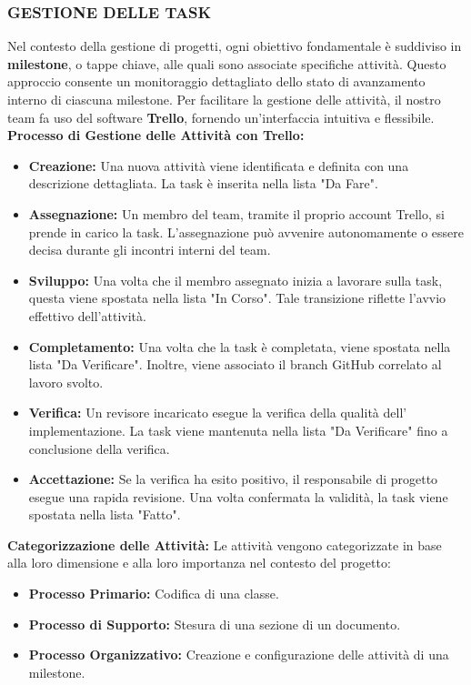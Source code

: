 \documentclass{article}
\begin{document}
\subsubsection{GESTIONE DELLE TASK}

Nel contesto della gestione di progetti, ogni obiettivo fondamentale è suddiviso in \textbf{milestone}, o tappe chiave, alle quali sono associate specifiche attività. Questo approccio consente un monitoraggio dettagliato dello stato di avanzamento interno di ciascuna milestone. Per facilitare la gestione delle attività, il nostro team fa uso del software \textbf{Trello}, fornendo un'interfaccia intuitiva e flessibile.\\
\textbf{Processo di Gestione delle Attività con Trello:}
\begin{itemize}
    \item \textbf{Creazione:}
    Una nuova attività viene identificata e definita con una descrizione dettagliata.
    La task è inserita nella lista "Da Fare".
    \item \textbf{Assegnazione:}
    Un membro del team, tramite il proprio account Trello, si prende in carico la task.
    L'assegnazione può avvenire autonomamente o essere decisa durante gli incontri interni del team.
    \item \textbf{Sviluppo:}
    Una volta che il membro assegnato inizia a lavorare sulla task, questa viene spostata nella lista "In Corso".
    Tale transizione riflette l'avvio effettivo dell'attività.
    \item \textbf{Completamento:}
    Una volta che la task è completata, viene spostata nella lista "Da Verificare".
    Inoltre, viene associato il branch GitHub correlato al lavoro svolto.
    \item \textbf{Verifica:}
    Un revisore incaricato esegue la verifica della qualità dell' implementazione.
    La task viene mantenuta nella lista "Da Verificare" fino a conclusione della verifica.
    \item \textbf{Accettazione:}
    Se la verifica ha esito positivo, il responsabile di progetto esegue una rapida revisione.
    Una volta confermata la validità, la task viene spostata nella lista "Fatto".
\end{itemize}

\textbf{Categorizzazione delle Attività:} Le attività vengono categorizzate in base alla loro dimensione e alla loro importanza nel contesto del progetto:
\begin{itemize}
    \item \textbf{Processo Primario:} Codifica di una classe.
    \item \textbf{Processo di Supporto:} Stesura di una sezione di un documento.
    \item \textbf{Processo Organizzativo:} Creazione e configurazione delle attività di una milestone.
\end{itemize}
\end{document}
